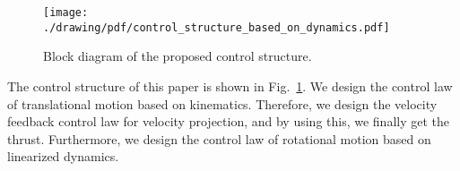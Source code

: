 \begin{figure}[t]
\centering
\texttt{[image: ./drawing/pdf/control\_structure\_based\_on\_dynamics.pdf]}
\caption{Block diagram of the proposed control structure.}
\label{fig:block_diagram_of_the_proposed_control_structure}
\end{figure}
The control structure of this paper is shown in Fig.~\ref{fig:block_diagram_of_the_proposed_control_structure}.
We design the control law of translational motion based on kinematics. 
Therefore, we design the velocity feedback control law for velocity projection, and by using this, we finally get the thrust.
Furthermore, we design the control law of rotational motion based on linearized dynamics.


